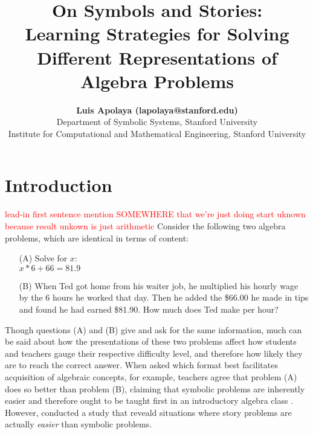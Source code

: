 \documentclass[10pt,letterpaper]{article}
\title{On Symbols and Stories:\\Learning Strategies for Solving Different Representations of Algebra Problems}
\author{{\large \bf Luis Apolaya (lapolaya@stanford.edu)} \\
  Department of Symbolic Systems, Stanford University
  \AND {\large \bf Amy Shoemaker (amyshoe@stanford.edu)} \\
  Institute for Computational and Mathematical Engineering, Stanford University}
\newcommand\TODO[1]{\textcolor{red}{#1}}
\begin{document}
\maketitle


%


\section{Introduction}

\TODO{lead-in first sentence}
\TODO{mention SOMEWHERE that we're just doing start uknown because result unkown is just arithmetic}
Consider the following two algebra problems, which are identical in terms of content:

\begin{enumerate}
\item[(A)] Solve for $x$:\\ $x * 6 + 66 = 81.9$

\item[(B)] When Ted got home from his waiter job, he multiplied his hourly wage by the 6 hours he worked that day. Then he added the \$66.00 he made in tips and found he had earned \$81.90. How much does Ted make per hour?
\end{enumerate}

Though questions (A) and (B) give and ask for the same information, much can be said about how the presentations of these two problems affect how students and teachers gauge their respective difficulty level, and therefore how likely they are to reach the correct answer. When asked which format best facilitates acquisition of algebraic concepts, for example, teachers agree that problem (A) does so better than problem (B), claiming that symbolic problems are inherently easier and therefore ought to be taught first in an introductory algebra class \cite{KoedNath2004,Nathan2012}. However,  conducted a study that reveald situations where story problems are actually \textit{easier} than symbolic problems. 
\end{document}
